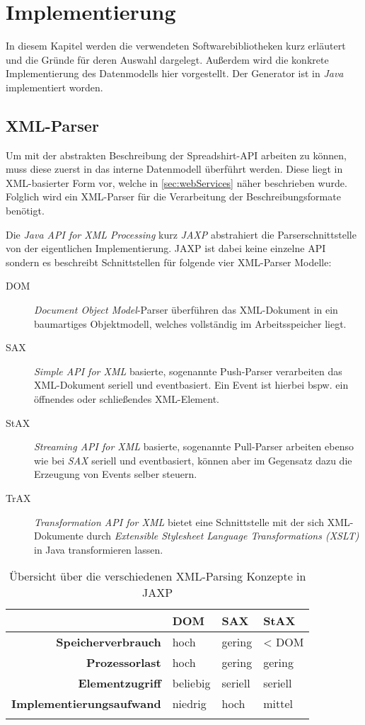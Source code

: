 \chapter{Implementierung}

In diesem Kapitel werden die verwendeten Softwarebibliotheken kurz erläutert und die Gründe für deren Auswahl dargelegt. Außerdem wird die konkrete Implementierung des Datenmodells hier vorgestellt. Der Generator ist in \emph{Java} implementiert worden.

\section{XML-Parser}

Um mit der abstrakten Beschreibung der Spreadshirt-API arbeiten zu können, muss diese zuerst in das interne Datenmodell überführt werden. Diese liegt in XML-basierter Form vor, welche in \cref{sec:webServices} näher beschrieben wurde. Folglich wird ein XML-Parser für die Verarbeitung der Beschreibungsformate benötigt.  

Die \emph{Java API for XML Processing} kurz \emph{JAXP} abstrahiert die Parserschnittstelle von der eigentlichen Implementierung. JAXP ist dabei keine einzelne API sondern es beschreibt Schnittstellen für folgende vier XML-Parser Modelle:

\begin{description}
    \item[DOM] \emph{Document Object Model}-Parser überführen das XML-Dokument in ein baumartiges Objektmodell, welches vollständig im Arbeitsspeicher liegt.
    \item[SAX] \emph{Simple API for XML} basierte, sogenannte Push-Parser verarbeiten das XML-Dokument seriell und eventbasiert. Ein Event ist hierbei bspw. ein öffnendes oder schließendes XML-Element.
    \item[StAX] \emph{Streaming API for XML} basierte, sogenannte Pull-Parser arbeiten ebenso wie bei \emph{SAX} seriell und eventbasiert, können aber im Gegensatz dazu die Erzeugung von Events selber steuern. 
    \item[TrAX] \emph{Transformation API for XML} bietet eine Schnittstelle mit der sich XML-Dokumente durch \emph{Extensible Stylesheet Language Transformations (XSLT)} in Java transformieren lassen.
\end{description}

\begin{longtable}[tb]{r l l l}
    \toprule
    \rowcolor{lightgray}
    & \textbf{DOM}   & \textbf{SAX}   & \textbf{StAX} \\
    \midrule
    \textbf{Speicherverbrauch} & hoch & gering & \textless{} DOM\\
    \textbf{Prozessorlast} & hoch & gering & gering \\
    \textbf{Elementzugriff} & beliebig & seriell & seriell \\
    \textbf{Implementierungsaufwand} & niedrig & hoch & mittel \\
    \bottomrule
    \caption{Übersicht über die verschiedenen XML-Parsing Konzepte in JAXP}
    \label{tab:xmlParsingModels}
\end{longtable}

